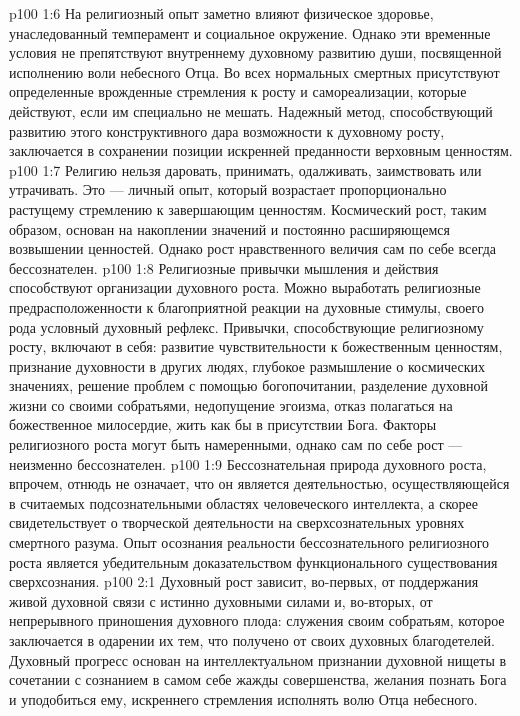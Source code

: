 \vs p100 1:6 \pc На религиозный опыт заметно влияют физическое здоровье, унаследованный темперамент и социальное окружение. Однако эти временные условия не препятствуют внутреннему духовному развитию души, посвященной исполнению воли небесного Отца. Во всех нормальных смертных присутствуют определенные врожденные стремления к росту и самореализации, которые действуют, если им специально не мешать. Надежный метод, способствующий развитию этого конструктивного дара возможности к духовному росту, заключается в сохранении позиции искренней преданности верховным ценностям.
\vs p100 1:7 Религию нельзя даровать, принимать, одалживать, заимствовать или утрачивать. Это --- личный опыт, который возрастает пропорционально растущему стремлению к завершающим ценностям. Космический рост, таким образом, основан на накоплении значений и постоянно расширяющемся возвышении ценностей. Однако рост нравственного величия сам по себе всегда бессознателен.
\vs p100 1:8 Религиозные привычки мышления и действия способствуют организации духовного роста. Можно выработать религиозные предрасположенности к благоприятной реакции на духовные стимулы, своего рода условный духовный рефлекс. Привычки, способствующие религиозному росту, включают в себя: развитие чувствительности к божественным ценностям, признание духовности в других людях, глубокое размышление о космических значениях, решение проблем с помощью богопочитании, разделение духовной жизни со своими собратьями, недопущение эгоизма, отказ полагаться на божественное милосердие, жить как бы в присутствии Бога. Факторы религиозного роста могут быть намеренными, однако сам по себе рост --- неизменно бессознателен.
\vs p100 1:9 Бессознательная природа духовного роста, впрочем, отнюдь не означает, что он является деятельностью, осуществляющейся в считаемых подсознательными областях человеческого интеллекта, а скорее свидетельствует о творческой деятельности на сверхсознательных уровнях смертного разума. Опыт осознания реальности бессознательного религиозного роста является убедительным доказательством функционального существования сверхсознания.
\vs p100 2:1 Духовный рост зависит, во\hyp{}первых, от поддержания живой духовной связи с истинно духовными силами и, во\hyp{}вторых, от непрерывного приношения духовного плода: служения своим собратьям, которое заключается в одарении их тем, что получено от своих духовных благодетелей. Духовный прогресс основан на интеллектуальном признании духовной нищеты в сочетании с сознанием в самом себе жажды совершенства, желания познать Бога и уподобиться ему, искреннего стремления исполнять волю Отца небесного.
